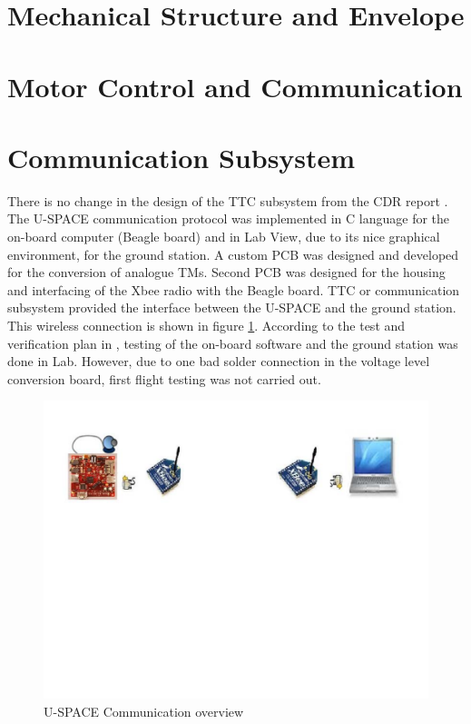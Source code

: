 \section{Mechanical Structure and Envelope}

\section{Motor Control and Communication}
%
%
%


\section{Communication Subsystem}
\label{sec:com}
There is no change in the design of the \ac{TTC} subsystem from the CDR report \cite{CDR_TTC}. The \ac{U-SPACE} communication protocol was implemented in C language for the on-board computer (Beagle board) and in Lab View, due to its nice graphical environment, for the ground station. A custom \ac{PCB} was designed and developed for the conversion of analogue \acp{TM}. Second \ac{PCB} was designed for the housing and interfacing of the Xbee radio with the Beagle board. \ac{TTC} or communication subsystem provided the interface between the \ac{U-SPACE} and the ground station. This wireless connection is shown in figure \ref{fig:com_setup}. According to the test and verification plan in \cite{CDR_TTC}, testing of the on-board software and the ground station was done in Lab. However, due to one bad solder connection in the voltage level conversion board, first flight testing was not carried out.
\begin{figure}[bht]
\centering
\includegraphics[scale=0.5]{figures/com_setup.pdf}
\caption[\ac{U-SPACE}Communication overview]{\ac{U-SPACE} Communication overview}
\label{fig:com_setup}
\end{figure}
%
